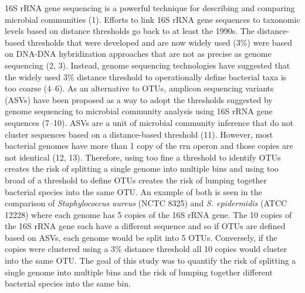 \documentclass[
]{article}
\begin{document}
16S rRNA gene sequencing is a powerful technique for describing and
comparing microbial communities (1). Efforts to link 16S rRNA gene
sequences to taxonomic levels based on distance thresholds go back to at
least the 1990s. The distance-based thresholds that were developed and
are now widely used (3\%) were based on DNA-DNA hybridization approaches
that are not as precise as genome sequencing (2, 3). Instead, genome
sequencing technologies have suggested that the widely used 3\% distance
threshold to operationally define bacterial taxa is too coarse (4--6).
As an alternative to OTUs, amplicon sequencing variants (ASVs) have been
proposed as a way to adopt the thresholds suggested by genome sequencing
to microbial community analysis using 16S rRNA gene sequences (7--10).
ASVs are a unit of microbial community inference that do not cluster
sequences based on a distance-based threshold (11). However, most
bacterial genomes have more than 1 copy of the rrn operon and those
copies are not identical (12, 13). Therefore, using too fine a threshold
to identify OTUs creates the risk of splitting a single genome into
multiple bins and using too broad of a threshold to define OTUs creates
the risk of lumping together bacterial species into the same OTU. An
example of both is seen in the comparison of \emph{Staphylococcus
aureus} (NCTC 8325) and \emph{S. epidermidis} (ATCC 12228) where each
genome has 5 copies of the 16S rRNA gene. The 10 copies of the 16S rRNA
gene each have a different sequence and so if OTUs are defined based on
ASVs, each genome would be split into 5 OTUs. Conversely, if the copies
were clustered using a 3\% distance threshold all 10 copies would
cluster into the same OTU. The goal of this study was to quantify the
risk of splitting a single genome into multiple bins and the risk of
lumping together different bacterial species into the same bin.
\end{document}
